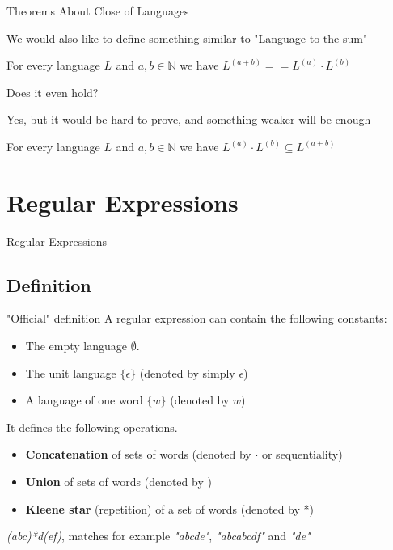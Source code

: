 \documentclass{beamer}
\newcommand{\languagesymbol}{L}
\newcommand{\languagei}[1]{\languagesymbol_{#1}}
\newcommand{\pow}[2]{#1^{#2}}
\newcommand{\close}[2]{\pow{#1}{(#2)}}
\newcommand{\languageclose}[1]{\close{\languagesymbol}{#1}}
\newcommand{\wordsymbol}{w}
\newcommand{\emptyword}{\epsilon}
\newcommand{\concatop}{\cdot}
\newcommand{\unitlang}{\{\emptyword\}}
\newcommand{\setof}[1]{\{#1\}}
\newcommand{\nats}{\mathbb{N}}
\begin{document}
\begin{frame}{Theorems About Close of Languages}
	
	We would also like to define something similar to "Language to the sum"
	
	\begin{lemma}
		\label{lem:sumCloseSame}
		For every language $\languagei{}$ and $a,b \in \nats$ we have $\languageclose{a+b} == \languageclose{a} \concatop \languageclose{b} $
	\end{lemma}
	 {
		Does it even hold?
		}
	
	 {Yes, but it would be hard to prove, and something weaker will be enough}
	
	 {
\begin{lemma}
	\label{lem:sumClose}
	For every language $\languagei{}$ and $a,b \in \nats$ we have $\languageclose{a} \concatop \languageclose{b} \subseteq \languageclose{a+b}$
\end{lemma}
		
		}
\end{frame}

\section{Regular Expressions}

\begin{frame}
	\Huge{\centerline{Regular Expressions}}
\end{frame}

\subsection{Definition}

\begin{frame}{"Official" definition}
	 A regular expression can contain the following constants:
	 \begin{itemize}
	 	\item The empty language $\emptyset$.
	 	\item The unit language $\unitlang$ (denoted by simply $\emptyword$)
	 	\item A language of one word $\setof{\wordsymbol}$ (denoted by $\wordsymbol$)
	 \end{itemize}
	 
	 It defines the following operations.
	 \begin{itemize}
	 	\item \textbf{Concatenation} of sets of words (denoted by $\concatop$ or sequentiality)
	 	\item \textbf{Union} of sets of words (denoted by \textbar)
	 	\item \textbf{Kleene star} (repetition) of a set of words (denoted by *)
	 \end{itemize}
	 
	 \begin{example}
	 	\textit{(abc)*d(e\textbar f)}, matches for example \textit{"abcde"}, \textit{"abcabcdf"} and \textit{"de"}
	 \end{example}
\end{frame}
\end{document}
